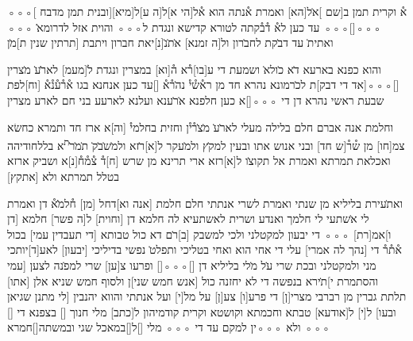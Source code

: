 
\begin{aramaictext}
◦◦◦[   ובנית תמן מדבח]א֯ וקרית תמן ב[שם ]א̇ל[הא] ואמרת א֯נתה הוא
א֯ל[הי א]ל[ה ע]ל[מיא] ◦◦◦[\hspace*{3em}]◦◦◦ עד כען לא֯ ד֯ב֯קתה לטורא קדישא ונגדת
ל◦◦◦ והוית אזל לדרומא̇̇ ◦◦◦ ואתית̇ עד דב̇קת לחב̇רון ול[ה זמנא] 
א̇ת̇נ̇[נ]יאת חברון ויתבת
[תרתין שנין ת]מ̇ן \vacat

והוא כפנא בארעא ד̇א כ̇ולא̇ ושמעת די ע[בו]ר֯א 
ה֯[וא] במצרין ונגדת
ל̇[מעמ] לאר̇̇ע̇ מ̇צרין [\hspace*{3em}]◦◦◦[\hspace*{3em}אד די דבק]ת לכ̇רמונא נהרא חד מן 
רא֯ש֯י֯ נה̇ר֯א֯ [\hspace*{3em}]עד כען אנחנא בגו א֯ר֯ע֯נ֯א֯ [וח]לפת שבעת ראשי נהרא דן 
די
◦◦◦[\hspace*{3em}]א כען חלפנא א̇ר̇ענא ועלנא לארעע בני חם לארע מצרין

\vacat
וחלמת אנה אברם חלם בלילה מעלי לאר̇ע̇ מ̇צ̇ר֯י֯ן וחזית בחלמי֯ [וה]א 
ארז חד ותמרא
כחשׂא צמ[חו] מן ש֯ר֯[ש חד] ובני אנוש אתו ובעין למק̇ץ ולמ̇עקר ל[א]ר̇זא 
ולמ̇ש̇ב̇ק̇ ת̇מ̇ר̇\textsuperscript{ת}א בללחודיהה
ואכלאת תמרתא ואמרת אל תקוצ̇ו ל[א]רזא ארי תרינא מן שרש [ח]ד֯ 
צ֯מ֯ח֯[נ]א ושביק ארזא בטלל תמרתא
ולא [אתקץ] \vacat

ואת̇עירת בליליא מן שנתי ואמרת לשרי אנתתי חלם 
חלמת [אנה וא]דחל [מן] ח֯למ̇̇א֯ דן ואמרת לי א̇שתעי לי חלמך ואנדע ושרית 
לאשתעיא לה חלמא דן
[וחוית] ל[ה פשר] חלמא [דן ו]אמ[רת] ◦◦◦ די יבעון למקטלני ולכי למשבק
[ב]ר̇ם דא כול טבותא
[די תעבדין עמי] בכול א֯ת֯ר֯ די [נהך לה אמרי] עלי די אחי הוא ואחי בטליכי
ותפלט̇ נפשי בדיליכי
[\hspace*{3em}יבעון] לאע[ד]יותכי מני ולמקטלני ובכת שרי ע̇ל מ̇לי בליליא דן
[\hspace*{3em}]◦◦◦[\hspace{16em}] ופרעו צ[ען\hspace*{3em}] שרי למפ̇נה לצען
[עמי והסתמרת י]ת̇ירא בנפשה די לא יחזנה כול [אנש חמש שני]ן ולסוף
חמש שניא אלן
[\hspace*{3em}אתו] תלתת גברין מן רברבי מצרי[ן\hspace*{3em}] די פרע[ו] צע[ן] על מל[י] ועל
אנתתי והווא יהנבין
[לי מתנן שגיאן ובעו] ל[י] ל[אודעא] טבתא וחכמתא וקושטא וקרית קודמיהון
ל[כתב] מלי חנוך
[\hspace{8em}] בצפנא די [\hspace*{3em}] ◦◦◦ ולא ◦◦◦ין למקם עד די ◦◦◦ מלי
[\hspace{4em}]ל[\hspace*{3em}]במאכל שגי ובמשתה[\hspace{16em}]חמרא
\hspace*{3em} 
\end{aramaictext}